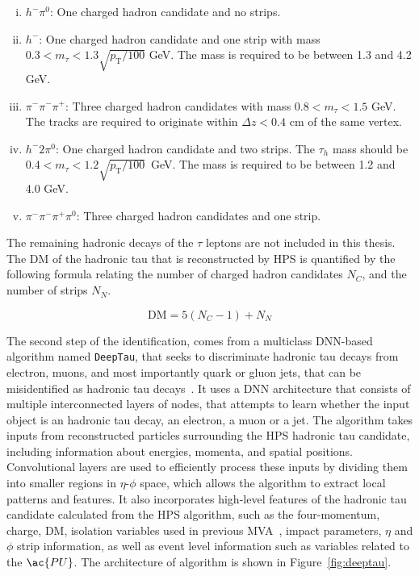 \begin{enumerate}[i)]
\item $h^- \pi^0$: One charged hadron candidate and no strips.
\item $h^-$: One charged hadron candidate and one strip with mass $ 0.3 < m_{\tau} < 1.3 \sqrt{p_{\text{T}}/100}$ GeV. The mass is required to be between 1.3 and 4.2 GeV.
\item $\pi^- \pi^- \pi^+$: Three charged hadron candidates with mass $0.8 < m_{\tau} < 1.5$ GeV. The tracks are required to originate within $\Delta z<0.4$ cm of the same vertex.
\item $h^- 2\pi^0$: One charged hadron candidate and two strips. The $\tau_{h}$ mass should be $0.4 < m_{\tau} < 1.2\sqrt{p_{\text{T}}/100}$~GeV. The mass is required to be between 1.2 and 4.0 GeV.
\item $\pi^- \pi^- \pi^+ \pi^0$: Three charged hadron candidates and one strip.
\end{enumerate}

The remaining hadronic decays of the $\tau$ leptons are not included in this thesis.
The \ac{DM} of the hadronic tau that is reconstructed by \ac{HPS} is quantified by the following formula relating the number of charged hadron candidates $N_C$, and the number of strips $N_N$.

\begin{equation}
\text{DM} = 5(N_{C} - 1) + N_{N}
\end{equation}

The second step of the identification, comes from a multiclass \ac{DNN}-based algorithm named \texttt{DeepTau}, that seeks to discriminate hadronic tau decays from electron, muons, and most importantly quark or gluon jets, that can be misidentified as hadronic tau decays~\cite{CMS:2022prd}.
It uses a \ac{DNN} architecture that consists of multiple interconnected layers of nodes, that attempts to learn whether the input object is an hadronic tau decay, an electron, a muon or a jet. 
The algorithm takes inputs from reconstructed particles surrounding the \ac{HPS} hadronic tau candidate, including information about energies, momenta, and spatial positions. 
Convolutional layers are used to efficiently process these inputs by dividing them into smaller regions in $\eta$-$\phi$ space, which allows the algorithm to extract local patterns and features. 
It also incorporates high-level features of the hadronic tau candidate calculated from the \ac{HPS} algorithm, such as the four-momentum, charge, \ac{DM}, isolation variables used in previous \ac{MVA}~\cite{CMS:2018jrd}, impact parameters, $\eta$ and $\phi$ strip information, as well as event level information such as variables related to the $\ac{PU}$.
The architecture of algorithm is shown in Figure~\ref{fig:deeptau}. \\

